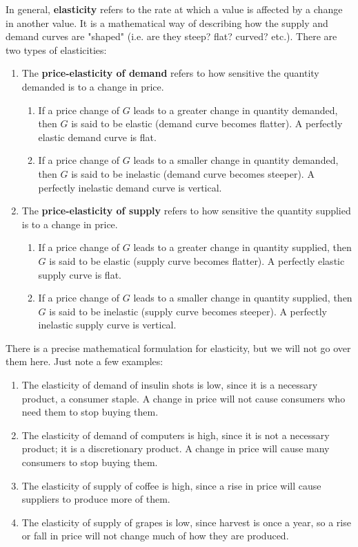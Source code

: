 \documentclass{article}
\begin{document}
    In general, \textbf{elasticity} refers to the rate at which a value is affected by a change in another value. It is a mathematical way of describing how the supply and demand curves are "shaped" (i.e. are they steep? flat? curved? etc.). There are two types of elasticities:
    \begin{enumerate}
      \item The \textbf{price-elasticity of demand} refers to how sensitive the quantity demanded is to a change in price.
      \begin{enumerate}
        \item If a price change of $G$ leads to a greater change in quantity demanded, then $G$ is said to be elastic (demand curve becomes flatter). A perfectly elastic demand curve is flat.
        \item If a price change of $G$ leads to a smaller change in quantity demanded, then $G$ is said to be inelastic (demand curve becomes steeper). A perfectly inelastic demand curve is vertical.
      \end{enumerate}

      \item The \textbf{price-elasticity of supply} refers to how sensitive the quantity supplied is to a change in price.
      \begin{enumerate}
        \item If a price change of $G$ leads to a greater change in quantity supplied, then $G$ is said to be elastic (supply curve becomes flatter). A perfectly elastic supply curve is flat.
        \item If a price change of $G$ leads to a smaller change in quantity supplied, then $G$ is said to be inelastic (supply curve becomes steeper). A perfectly inelastic supply curve is vertical.
      \end{enumerate}

    \end{enumerate}
    There is a precise mathematical formulation for elasticity, but we will not go over them here. Just note a few examples:
    \begin{enumerate}
      \item The elasticity of demand of insulin shots is low, since it is a necessary product, a consumer staple. A change in price will not cause consumers who need them to stop buying them.
      \item The elasticity of demand of computers is high, since it is not a necessary product; it is a discretionary product. A change in price will cause many consumers to stop buying them.
      \item The elasticity of supply of coffee is high, since a rise in price will cause suppliers to produce more of them.
      \item The elasticity of supply of grapes is low, since harvest is once a year, so a rise or fall in price will not change much of how they are produced.
    \end{enumerate}
\end{document}
